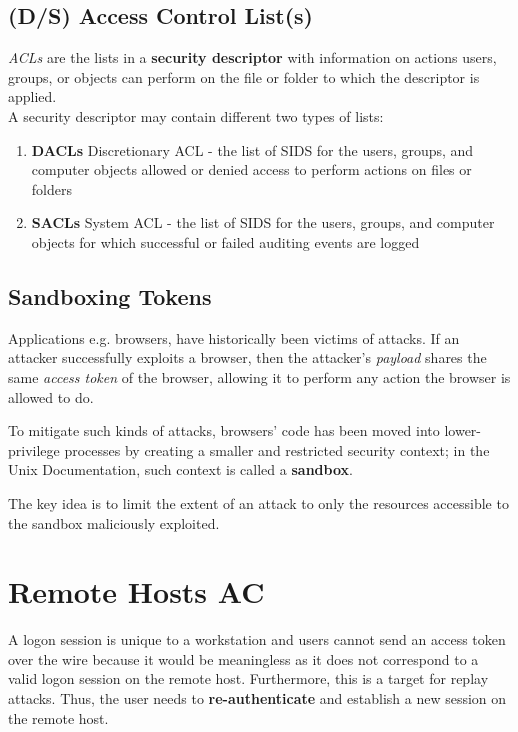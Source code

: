 \subsection{(D/S) Access Control List(s)}
\textit{ACLs} are the lists in a \textbf{security descriptor} with information on actions
users, groups, or objects can perform on the file or folder to which the descriptor is applied.\\
A security descriptor may contain different two types of lists:
\begin{enumerate}
   \item \textbf{DACLs} Discretionary ACL -
   the list of SIDS for the users, groups, and computer objects allowed or denied access to perform actions on files or folders
   \item \textbf{SACLs} System ACL -
   the list of SIDS for the users, groups, and computer objects for which successful or failed auditing events are logged
\end{enumerate}


\subsection{Sandboxing Tokens}
Applications e.g. browsers, have historically been victims of attacks.
If an attacker successfully exploits a browser,
then the attacker's \textit{payload} shares the same \textit{access token} of the browser,
allowing it to perform any action the browser is allowed to do.

To mitigate such kinds of attacks, browsers' code has been moved into lower-privilege processes by creating a smaller and restricted security context;
in the Unix Documentation, such context is called a \textbf{sandbox}.

The key idea is to limit the extent of an attack to only the resources accessible to the sandbox maliciously exploited. 

\section{Remote Hosts AC}
A logon session is unique to a workstation and users cannot send an access token over the wire because it would be meaningless as it does not correspond to a valid logon session on the remote host. Furthermore, this is a target for replay attacks.
Thus, the user needs to \textbf{re-authenticate} and establish a new session on the remote host.

